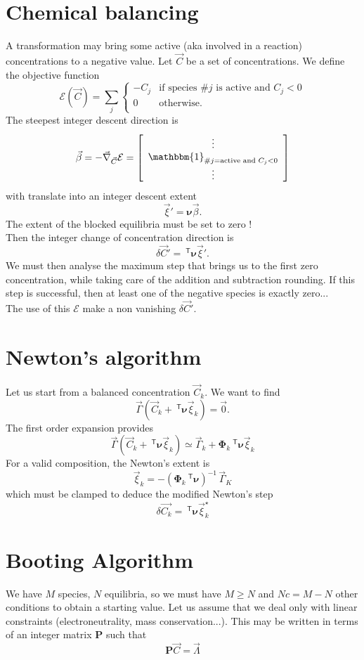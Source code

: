 \documentclass[aps]{revtex4}
\newcommand{\mymat}[1]{\bm{#1}}
\newcommand{\mytrn}[1]{~^{\mathsf{T}}{#1}}
\begin{document}
\section{Chemical balancing}
A transformation may bring some active (aka involved in a reaction) concentrations to a negative value.
Let $\vec{C}$ be a set of concentrations. We define the objective function
$$
	\mathcal{E}(\vec{C}) = \sum_j 
	\left
	\lbrace
		\begin{array}{rl}
		-C_j & \text{if species \#}j\text{ is active and } C_j<0\\
		0    & \text{otherwise.}\\
		\end{array} 
	\right.
$$
The steepest integer descent direction is
$$
	\vec{\beta} = -\vec{\nabla}_{\vec{C}} \mathcal{E} = 
	\left\lbrack
		\begin{array}{c}
		\vdots\\
		\mathbbm{1}_{\text{\#}j=\text{active and } C_j<0}\\
		\vdots
		\end{array}
	\right\rbrack
$$
with translate into an integer descent extent
$$
	\vec{\xi}' = \mymat{\nu} \vec{\beta}.
$$
The extent of the blocked equilibria must be set to zero !\\
Then the integer change of concentration direction is
$$
	\delta\vec{C}' = \mytrn{\mymat{\nu}}\vec{\xi}'.
$$
We must then analyse the maximum step that brings us to the
first zero concentration, while taking care of the addition and subtraction rounding.
If this step is successful, then at least one of the negative species is exactly zero...\\

The use of this $\mathcal{E}$ make a non vanishing $\delta\vec{C}'$.

\section{Newton's algorithm}
Let us start from a balanced concentration $\vec{C}_k$.
We want to find
$$
	\vec{\Gamma}(\vec{C}_k + \mytrn{\mymat{\nu}}\vec{\xi}_k) = \vec{0}.
$$
The first order expansion provides
$$
	\vec{\Gamma}(\vec{C}_k + \mytrn{\mymat{\nu}}\vec{\xi}_k) \simeq 
	\vec{\Gamma}_k + \mymat{\Phi}_k\mytrn{\mymat{\nu}} \vec{\xi}_k
$$
For a valid composition, the Newton's extent is
$$
		\vec{\xi}_k = -\left(\mymat{\Phi}_k\mytrn{\mymat{\nu}}\right)^{-1}\,\vec{\Gamma}_K
$$
which must be clamped to deduce the modified Newton's step
$$
	\delta{\vec{C_k}} = \mytrn{\mymat{\nu}} \vec{\xi}_k^\star
$$

\section{Booting Algorithm}
We have $M$ species, $N$ equilibria, 
so we must have $M\geq N$ and $Nc=M-N$ other conditions
to obtain a starting value.
Let us assume that we deal only with linear constraints (electroneutrality, mass conservation...).
This may be written in terms of an integer matrix $\mymat{P}$
such that
$$
	\mymat{P}\vec{C} = \vec{\Lambda}
$$
\end{document}

